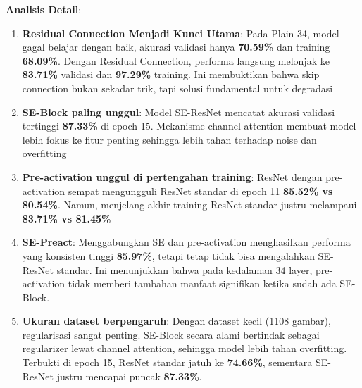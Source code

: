 \textbf{Analisis Detail}:
\begin{enumerate}
    \item \textbf{Residual Connection Menjadi Kunci Utama}: Pada Plain-34, model gagal belajar dengan baik, akurasi validasi hanya \textbf{70.59\%} dan training \textbf{68.09\%}. Dengan Residual Connection, performa langsung melonjak ke \textbf{83.71\%} validasi dan \textbf{97.29\%} training. Ini membuktikan bahwa skip connection bukan sekadar trik, tapi solusi fundamental untuk degradasi
    \item \textbf{SE-Block paling unggul}: Model SE-ResNet mencatat akurasi validasi tertinggi \textbf{87.33\%} di epoch 15. Mekanisme channel attention membuat model lebih fokus ke fitur penting sehingga lebih tahan terhadap noise dan overfitting
    
    \item \textbf{Pre-activation unggul di pertengahan training}: ResNet dengan pre-activation sempat mengungguli ResNet standar di epoch 11 \textbf{85.52\% vs 80.54\%}. Namun, menjelang akhir training ResNet standar justru melampaui \textbf{83.71\% vs 81.45\%}
    
    \item \textbf{SE-Preact}: Menggabungkan SE dan pre-activation menghasilkan performa yang konsisten tinggi \textbf{85.97\%}, tetapi tetap tidak bisa mengalahkan SE-ResNet standar. Ini menunjukkan bahwa pada kedalaman 34 layer, pre-activation tidak memberi tambahan manfaat signifikan ketika sudah ada SE-Block.

    \item \textbf{Ukuran dataset berpengaruh}: Dengan dataset kecil (1108 gambar), regularisasi sangat penting. SE-Block secara alami bertindak sebagai regularizer lewat channel attention, sehingga model lebih tahan overfitting. Terbukti di epoch 15, ResNet standar jatuh ke \textbf{74.66\%}, sementara SE-ResNet justru mencapai puncak \textbf{87.33\%}.
\end{enumerate}
